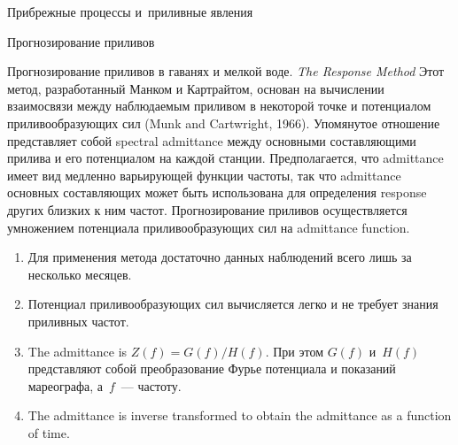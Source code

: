 \begin{chapter}{Прибрежные процессы и~приливные явления}
\begin{section}{Прогнозирование приливов}
\begin{paragraph}{Прогнозирование приливов в гаванях и мелкой воде.}
\textit{The Response Method} Этот метод, разработанный Манком и Картрайтом, основан на
вычислении взаимосвязи между наблюдаемым приливом в некоторой точке и
потенциалом приливообразующих сил (Munk and Cartwright, 1966).
Упомянутое отношение представляет собой spectral admittance
между основными составляющими прилива и его потенциалом на каждой станции.
Предполагается, что admittance имеет вид медленно варьирующей функции частоты,
так что admittance основных составляющих может быть использована для 
определения response других близких к ним частот. Прогнозирование приливов
осуществляется умножением потенциала приливообразующих сил на admittance
function.
%
%
\begin{enumerate}
\item 
Для применения метода достаточно данных наблюдений всего лишь 
за несколько месяцев.
%

\item 
Потенциал приливообразующих сил вычисляется легко и не требует знания 
приливных частот.
%

\item 
The admittance is $Z(f) = G(f)/H(f)$. При этом $G(f)$ и~$H(f)$ представляют
собой преобразование Фурье потенциала и показаний мареографа, 
а~$f$~--- частоту.
%

\item 
The admittance is inverse transformed to obtain the admittance as a
function of time.
%


\end{enumerate}
\end{paragraph}
\end{section}
\end{chapter}
